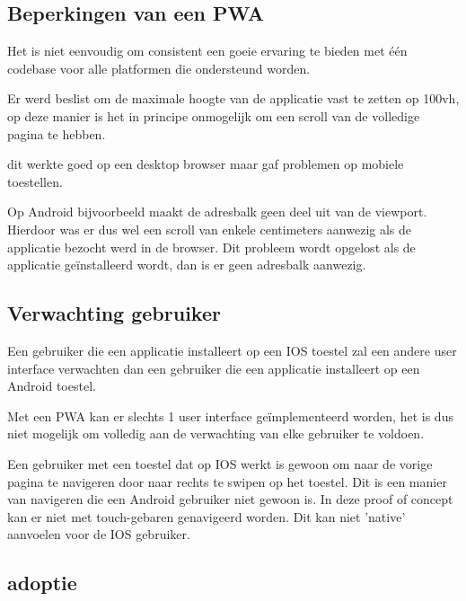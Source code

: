  	
 	\subsection{Beperkingen van een PWA}
 			
			Het is niet eenvoudig om consistent een goeie ervaring te bieden met één codebase voor alle platformen die ondersteund worden. 
			
			Er werd beslist om de maximale hoogte van de applicatie vast te zetten op 100vh,  op deze manier is het in principe onmogelijk om een scroll van de volledige pagina te hebben. 
			
			dit werkte goed op een desktop browser maar gaf problemen op mobiele toestellen.
			
			Op Android bijvoorbeeld maakt de adresbalk geen deel uit van de viewport. Hierdoor was er dus wel een scroll van enkele centimeters aanwezig als de applicatie bezocht werd in de browser. Dit probleem wordt opgelost als de applicatie geïnstalleerd wordt, dan is er geen adresbalk aanwezig.
		
	\subsection{Verwachting gebruiker}
		Een gebruiker die een applicatie installeert op een IOS toestel zal een andere user interface verwachten dan een gebruiker die een applicatie installeert op een Android toestel.
		
		Met een PWA kan er slechts 1 user interface geïmplementeerd worden, het is dus niet mogelijk om volledig aan de verwachting van elke gebruiker te voldoen.
		
		Een gebruiker met een toestel dat op IOS werkt is gewoon om naar de vorige pagina te navigeren door naar rechts te swipen op het toestel. Dit is een manier van navigeren die een Android gebruiker niet gewoon is. In deze proof of concept kan er niet met touch-gebaren genavigeerd worden. Dit kan niet 'native' aanvoelen voor de IOS gebruiker. 
		
		
		
		
	\subsection{adoptie}
	
	
	
	
			
		